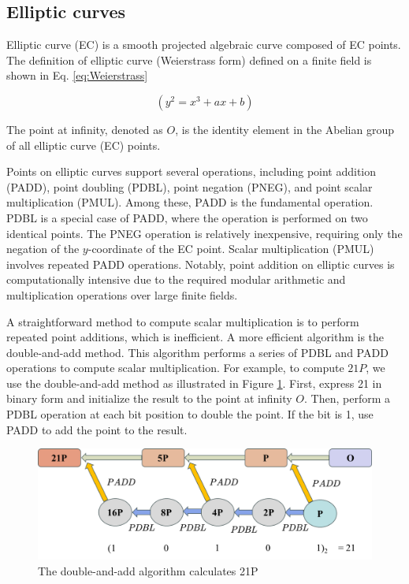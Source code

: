 \documentclass[conference]{IEEEtran}
\begin{document}
\subsection{Elliptic curves}
Elliptic curve (EC) is a smooth projected algebraic curve composed of EC points. The definition of elliptic curve (Weierstrass form) defined on a finite field is shown in Eq. \eqref{eq:Weierstrass}

\begin{equation}
(y^2=x^3+ax+b)
\label{eq:Weierstrass}
\end{equation}

The point at infinity, denoted as \( O \), is the identity element in the Abelian group of all elliptic curve (EC) points.

Points on elliptic curves support several operations, including point addition (PADD), point doubling (PDBL), point negation (PNEG), and point scalar multiplication (PMUL). Among these, PADD is the fundamental operation. PDBL is a special case of PADD, where the operation is performed on two identical points. The PNEG operation is relatively inexpensive, requiring only the negation of the \( y \)-coordinate of the EC point. Scalar multiplication (PMUL) involves repeated PADD operations. Notably, point addition on elliptic curves is computationally intensive due to the required modular arithmetic and multiplication operations over large finite fields.

A straightforward method to compute scalar multiplication is to perform repeated point additions, which is inefficient. A more efficient algorithm is the double-and-add method. This algorithm performs a series of PDBL and PADD operations to compute scalar multiplication. For example, to compute \( 21P \), we use the double-and-add method as illustrated in Figure \ref{fig:double-add}. First, express 21 in binary form and initialize the result to the point at infinity \( O \). Then, perform a PDBL operation at each bit position to double the point. If the bit is 1, use PADD to add the point to the result.

\begin{figure}[h]
\centering
\includegraphics[width=1\linewidth]{image/double-and-add.png}
\caption{The double-and-add algorithm calculates 21P}
\label{fig:double-add}
\end{figure}
\end{document}
